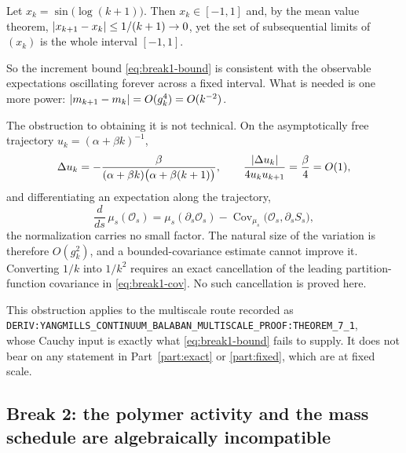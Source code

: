 \begin{proposition}[Counterexample]
\label{prop:break1}
Let $x_k = \sin\!\big(\log(k+1)\big)$. Then $x_k \in [-1,1]$ and, by the
mean value theorem, $\left\lvert x_{k+1} - x_k \right\rvert \le 1/(k+1) \to 0$, yet the set
of subsequential limits of $(x_k)$ is the whole interval $[-1,1]$.
\end{proposition}

So the increment bound \eqref{eq:break1-bound} is consistent with the
observable expectations oscillating forever across a fixed interval. What
is needed is one more power: $\left\lvert m_{k+1} - m_k \right\rvert = O(g_k^4) = O(k^{-2})$.

The obstruction to obtaining it is not technical. On the asymptotically
free trajectory $u_k = (\alpha + \beta k)^{-1}$,
\begin{equation}
  \Delta u_k = -\frac{\beta}{(\alpha+\beta k)\big(\alpha + \beta(k+1)\big)},
  \qquad
  \frac{\left\lvert \Delta u_k \right\rvert}{4 u_k u_{k+1}} = \frac{\beta}{4} = O(1),
\end{equation}
and differentiating an expectation along the trajectory,
\begin{equation}
  \frac{d}{ds}\,\mu_s(\mathcal{O}_s)
  = \mu_s(\partial_s \mathcal{O}_s)
  - \operatorname{Cov}_{\mu_s}\!\big(\mathcal{O}_s, \partial_s S_s\big),
  \label{eq:break1-cov}
\end{equation}
the normalization carries no small factor. The natural size of the
variation is therefore $O(g_k^2)$, and a bounded-covariance estimate
cannot improve it. Converting $1/k$ into $1/k^2$ requires an exact
cancellation of the leading partition-function covariance in
\eqref{eq:break1-cov}. No such cancellation is proved here.

\begin{scopenote}
This obstruction applies to the multiscale route recorded as\\
\texttt{\small DERIV:YANGMILLS\_CONTINUUM\_\allowbreak{}BALABAN\_\allowbreak{}MULTISCALE\_\allowbreak{}PROOF:\allowbreak{}THEOREM\_7\_1},\\
whose Cauchy input is exactly what \eqref{eq:break1-bound} fails to
supply. It does not bear on any statement in
Part~\ref{part:exact} or \ref{part:fixed}, which are at fixed scale.
\end{scopenote}

\subsection{Break 2: the polymer activity and the mass schedule are algebraically incompatible}
\label{sec:break2}

